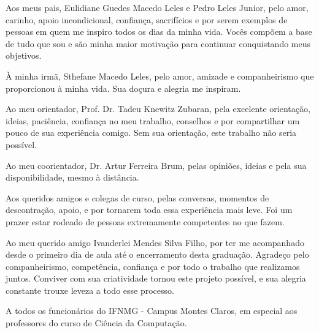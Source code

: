 Aos meus pais, Eulidiane Guedes Macedo Leles e Pedro Leles Junior, pelo amor, carinho, apoio incondicional, confiança, sacrifícios e por serem exemplos de pessoas em quem me inspiro todos os dias da minha vida. Vocês compõem a base de tudo que sou e são minha maior motivação para continuar conquistando meus objetivos. 

À minha irmã, Sthefane Macedo Leles, pelo amor, amizade e companheirismo que proporcionou à minha vida. Sua doçura e alegria me inspiram.

Ao meu orientador, Prof. Dr. Tadeu Knewitz Zubaran, pela excelente orientação, ideias, paciência, confiança no meu trabalho, conselhos e por compartilhar um pouco de sua experiência comigo. Sem sua orientação, este trabalho não seria possível.

Ao meu coorientador, Dr. Artur Ferreira Brum, pelas opiniões, ideias e pela sua disponibilidade, mesmo à distância.

Aos queridos amigos e colegas de curso, pelas conversas, momentos de descontração, apoio, e por tornarem toda essa experiência mais leve. Foi um prazer estar rodeado de pessoas extremamente competentes no que fazem.

Ao meu querido amigo Ivanderlei Mendes Silva Filho, por ter me acompanhado desde o primeiro dia de aula até o encerramento desta graduação. Agradeço pelo companheirismo, competência, confiança e por todo o trabalho que realizamos juntos. Conviver com sua criatividade tornou este projeto possível, e sua alegria constante trouxe leveza a todo esse processo.

A todos os funcionários do IFNMG - Campus Montes Claros, em especial aos professores do curso de Ciência da Computação.